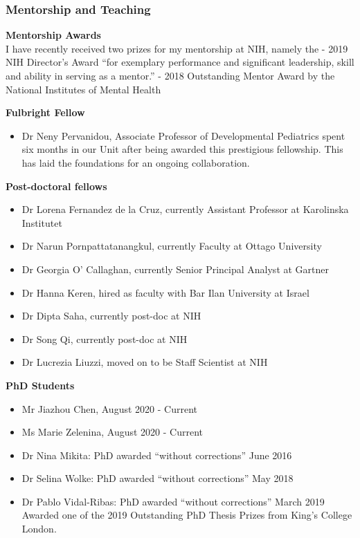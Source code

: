 \documentclass[
]{article}
\providecommand{\tightlist}{%
  \setlength{\itemsep}{0pt}\setlength{\parskip}{0pt}}
\begin{document}
\hypertarget{mentorship-and-teaching}{%
\subsubsection{Mentorship and Teaching}\label{mentorship-and-teaching}}

\textbf{Mentorship Awards}\\
I have recently received two prizes for my mentorship at NIH, namely the
- 2019 NIH Director's Award ``for exemplary performance and significant
leadership, skill and ability in serving as a mentor.'' - 2018
Outstanding Mentor Award by the National Institutes of Mental Health

\textbf{Fulbright Fellow}

\begin{itemize}
\tightlist
\item
  Dr Neny Pervanidou, Associate Professor of Developmental Pediatrics
  spent six months in our Unit after being awarded this prestigious
  fellowship. This has laid the foundations for an ongoing
  collaboration.
\end{itemize}

\textbf{Post-doctoral fellows}

\begin{itemize}
\item
  Dr Lorena Fernandez de la Cruz, currently Assistant Professor at
  Karolinska Institutet
\item
  Dr Narun Pornpattatanangkul, currently Faculty at Ottago University
\item
  Dr Georgia O' Callaghan, currently Senior Principal Analyst at Gartner
\item
  Dr Hanna Keren, hired as faculty with Bar Ilan University at Israel
\item
  Dr Dipta Saha, currently post-doc at NIH
\item
  Dr Song Qi, currently post-doc at NIH
\item
  Dr Lucrezia Liuzzi, moved on to be Staff Scientist at NIH
\end{itemize}

\textbf{PhD Students}

\begin{itemize}
\item
  Mr Jiazhou Chen, August 2020 - Current
\item
  Ms Marie Zelenina, August 2020 - Current
\item
  Dr Nina Mikita: PhD awarded ``without corrections'' June 2016
\item
  Dr Selina Wolke: PhD awarded ``without corrections'' May 2018
\item
  Dr Pablo Vidal-Ribas: PhD awarded ``without corrections'' March 2019
  Awarded one of the 2019 Outstanding PhD Thesis Prizes from King's
  College London.
\end{itemize}
\end{document}
